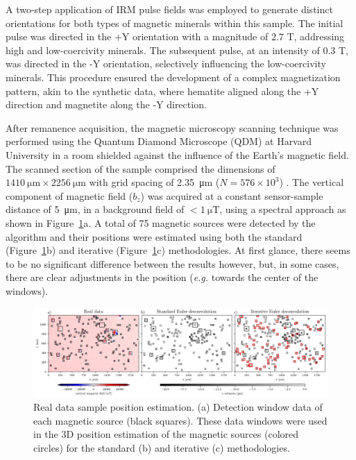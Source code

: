 A two-step application of IRM pulse fields was employed to generate distinct orientations for both types of magnetic minerals within this sample. The initial pulse was directed in the +Y orientation with a magnitude of 2.7 T, addressing high and low-coercivity minerals. The subsequent pulse, at an intensity of 0.3 T, was directed in the -Y orientation, selectively influencing the low-coercivity minerals. This procedure ensured the development of a complex magnetization pattern, akin to the synthetic data, where hematite aligned along the +Y direction and magnetite along the -Y direction.

After remanence acquisition, the magnetic microscopy scanning technique was performed using the Quantum
Diamond Microscope (QDM) at Harvard University in a room shielded against the influence of the Earth's magnetic field. The scanned section of the sample comprised the dimensions of $\qty{1410}{\um} \times \qty{2256}{\um}$ with grid spacing of \qty{2.35}{\um} ($N = 576 \times 10^{3}$) \citep{janinedata}. The vertical component of magnetic field ($b_z$) was acquired at a constant sensor-sample distance of \qty{5}{\um}, in a background field of $< \qty{1}{\micro\tesla}$, using a spectral approach \citep{Lima2009, Fu2020, Glenn2017} as shown in Figure~\ref{real-data-euler}a. A total of 75 magnetic sources were detected by the algorithm and their positions were estimated using both the standard (Figure~\ref{real-data-euler}b) and iterative (Figure~\ref{real-data-euler}c) methodologies. At first glance, there seems to be no significant difference between the results however, but, in some cases, there are clear adjustments in the position (\textit{e.g.} towards the center of the windows).

\begin{figure}[tb!]
  \centering
  \includegraphics[width=1\linewidth]{paper/figures/euler-comparion-real.png}
  \caption{Real data sample position estimation. (a) Detection window data of each magnetic source (black squares). These data windows were used in the 3D position estimation of the magnetic sources (colored circles) for the standard (b) and iterative (c) methodologies. }
  \label{real-data-euler}
\end{figure}

